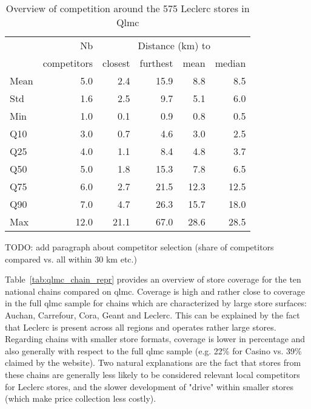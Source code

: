 \documentclass[11pt]{article}
\begin{document}
\begin{table}[H]
\renewcommand{\arraystretch}{0.7}%
\caption{Overview of competition around the 575 Leclerc stores in Qlmc}\label{tab:qlmc_comp}
\small
\begin{tabular}{lr|rrrr}
\toprule
\toprule
{}         & Nb          &    \multicolumn{4}{c}{Distance (km) to} \\
{}         & competitors &    closest & furthest & mean & median \\
\midrule
Mean  &   5.0 &   2.4 &  15.9 &   8.8 &     8.5 \\
Std   &   1.6 &   2.5 &   9.7 &   5.1 &     6.0 \\
Min   &   1.0 &   0.1 &   0.9 &   0.8 &     0.5 \\
Q10   &   3.0 &   0.7 &   4.6 &   3.0 &     2.5 \\
Q25   &   4.0 &   1.1 &   8.4 &   4.8 &     3.7 \\
Q50   &   5.0 &   1.8 &  15.3 &   7.8 &     6.5 \\
Q75   &   6.0 &   2.7 &  21.5 &  12.3 &    12.5 \\
Q90   &   7.0 &   4.7 &  26.3 &  15.7 &    18.0 \\
Max   &  12.0 &  21.1 &  67.0 &  28.6 &    28.5 \\
\bottomrule
\bottomrule
\end{tabular}
\end{table}

TODO: add paragraph about competitor selection (share of competitors compared vs. all within 30 km etc.)

Table~\ref{tab:qlmc_chain_repr} provides an overview of store coverage for the ten national chains compared on qlmc. Coverage is high and rather close to coverage in the full qlmc sample for chains which are characterized by large store surfaces: Auchan, Carrefour, Cora, Geant and Leclerc. This can be explained by the fact that Leclerc is present across all regions and operates rather large stores. Regarding chains with smaller store formats, coverage is lower in percentage and also generally with respect to the full qlmc sample (e.g. 22\% for Casino vs. 39\% claimed by the website). Two natural explanations are the fact that stores from these chains are generally less likely to be considered relevant local competitors for Leclerc stores, and the slower development of "drive" within smaller stores (which make price collection less costly).
\end{document}
